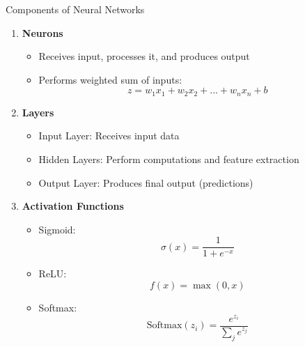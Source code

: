 \documentclass[aspectratio=169]{beamer}
\begin{document}
\begin{frame}[fragile]{Components of Neural Networks}
    \begin{enumerate}
        \item \textbf{Neurons}
            \begin{itemize}
                \item Receives input, processes it, and produces output
                \item Performs weighted sum of inputs: 
                \begin{equation}
                    z = w_1x_1 + w_2x_2 + ... + w_nx_n + b
                \end{equation}
            \end{itemize}
        \item \textbf{Layers}
            \begin{itemize}
                \item Input Layer: Receives input data
                \item Hidden Layers: Perform computations and feature extraction
                \item Output Layer: Produces final output (predictions)
            \end{itemize}
        \item \textbf{Activation Functions}
            \begin{itemize}
                \item Sigmoid: 
                \begin{equation}
                    \sigma(x) = \frac{1}{1 + e^{-x}}
                \end{equation}
                \item ReLU: 
                \begin{equation}
                    f(x) = \max(0, x)
                \end{equation}
                \item Softmax: 
                \begin{equation}
                    \text{Softmax}(z_i) = \frac{e^{z_i}}{\sum_{j} e^{z_j}}
                \end{equation}
            \end{itemize}
    \end{enumerate}
\end{frame}
\end{document}
